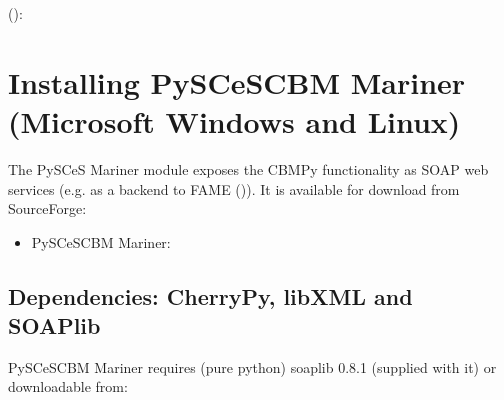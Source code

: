 \documentclass[letterpaper,10pt,english]{sphinxmanual}
\begin{document}
\sphinxAtStartPar
{} ():

\begin{sphinxVerbatim}[commandchars=\\\{\}]
 
  
   
\end{sphinxVerbatim}


\section{Installing PySCeS\sphinxhyphen{}CBM Mariner (Microsoft Windows and Linux)}
\label{\detokenize{install_doc:installing-pysces-cbm-mariner-microsoft-windows-and-linux}}
\sphinxAtStartPar
The PySCeS Mariner module exposes the CBMPy functionality as SOAP
web services (e.g. as a backend to FAME ()). It is available for download from SourceForge:
\begin{itemize}
\item {} 
\sphinxAtStartPar
PySCeS\sphinxhyphen{}CBM Mariner: 

\end{itemize}


\subsection{Dependencies: CherryPy, libXML and SOAPlib}
\label{\detokenize{install_doc:dependencies-cherrypy-libxml-and-soaplib}}
\sphinxAtStartPar
PySCeS\sphinxhyphen{}CBM Mariner requires (pure python) soaplib 0.8.1 (supplied with it) or
downloadable from:

\begin{sphinxVerbatim}[commandchars=\\\{\}]
\end{sphinxVerbatim}
\end{document}
